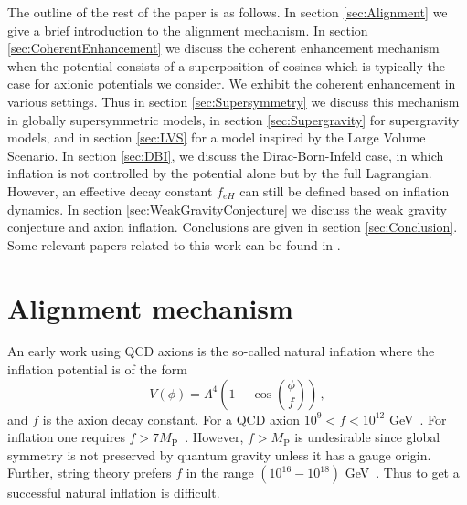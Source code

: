 \documentclass[12pt]{article}
\begin{document}
The outline of the rest of the paper is as follows.
In section \ref{sec:Alignment} we give a brief introduction to the alignment mechanism.
In section \ref{sec:CoherentEnhancement} we discuss the coherent enhancement mechanism when the potential consists of a superposition of cosines which is typically the case for axionic potentials we consider.
We exhibit the coherent enhancement in various settings.
Thus in section \ref{sec:Supersymmetry} we discuss this mechanism in globally supersymmetric models, in section \ref{sec:Supergravity} for supergravity models, and in section \ref{sec:LVS} for a model inspired by the Large Volume Scenario.
In section \ref{sec:DBI}, we discuss the Dirac-Born-Infeld case, in which inflation is not controlled by the potential alone but by the full Lagrangian.
However, an effective decay constant $f_{eH}$ can still be defined based on inflation dynamics.
In section \ref{sec:WeakGravityConjecture} we discuss the weak gravity conjecture and axion inflation.
Conclusions are given in section \ref{sec:Conclusion}.
Some relevant papers related to this work can be found in \cite{BlancoPillado:2006he, Conlon:2005jm, Ben-Dayan:2014lca, Gao:2014uha}.

\section{Alignment mechanism \label{sec:Alignment}}
An early work using QCD axions is the so-called natural inflation where the inflation potential is of the form
\begin{equation} \label{eq:naturalInflationPotential}
  V\left(\phi\right) = \Lambda^4 \left(1 - \cos\left(\frac{\phi}{f}\right)\right)\,,
\end{equation}
and $f$ is the axion decay constant.
For a QCD axion $10^9 < f < 10^{12}$ GeV~\cite{Svrcek:2006yi}.
For inflation one requires $f > 7 M_\text{P}$~\cite{Akrami:2018odb}.
However, $f > M_\text{P}$ is undesirable since global symmetry is not preserved by quantum gravity unless it has a gauge origin.
Further, string theory prefers $f$ in the range $\left(10^{16} - 10^{18}\right)$ GeV~\cite{Svrcek:2006yi}.
Thus to get a successful natural inflation is difficult.
\end{document}
